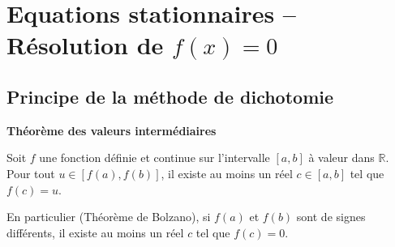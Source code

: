 \def\xxactivite{Cours}
\def\xxauteur{\textsl{Xavier Pessoles}}

\fichefalse
\proftrue
\tdfalse
\courstrue

\def\xxnumchapitre{Chapitre 1 \vspace{.2cm}}
\def\xxchapitre{\hspace{.12cm} Introduction aux méthodes numériques}

\def\xxcompetences{%
\textsl{%
\textbf{Savoirs et compétences :}\\
\begin{itemize}[label=\ding{112},font=\color{ocre}] 
\item B2-12 : proposer un modèle cinématique à partir d'un système réel ou d'une maquette numérique;
\item B2-15 : Simplifier un modèle de mécanisme.
\end{itemize}
}}


\def\xxfigures{

}%


\vspace{2cm}
\pagestyle{fancy}
\thispagestyle{plain}


\section{Equations stationnaires -- Résolution de $f(x)=0$}

\subsection{Principe de la méthode de dichotomie}

\begin{theorem}
\textbf{Théorème des valeurs intermédiaires}

Soit $f$ une fonction définie et continue sur l'intervalle $[a,b]$ à valeur dans $\mathbb{R}$. Pour tout $u\in[f(a),f(b)]$, il existe au moins un réel $c\in [a,b]$  tel que $f(c)=u$.

 En particulier (Théorème de Bolzano), si $f(a)$ et $f(b)$ sont de signes différents, il existe au moins un réel $c$ tel que $f(c)=0$. 
\end{theorem}

